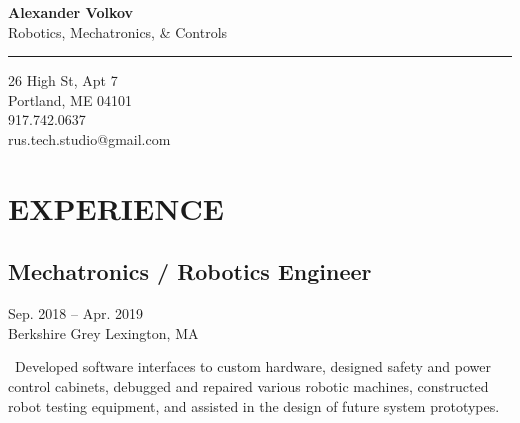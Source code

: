 \documentclass[]{article}
\begin{document}
\begin{center} %
	{\Large\bf Alexander Volkov}\\
	{\large Robotics, Mechatronics, \& Controls} \\
	
	\rule{\textwidth}{1pt}
	\vspace*{-0.5em}
	
	26 High St, Apt 7 \\
	Portland, ME 04101 \\
	917.742.0637 \\
	rus.tech.studio@gmail.com
\end{center}



\section*{EXPERIENCE}

\subsection*{Mechatronics / Robotics Engineer} \hfill Sep. 2018 -- Apr. 2019 \\
Berkshire Grey \hfill Lexington, MA

\textellipsis~Developed software interfaces to custom hardware, designed safety and power control cabinets, debugged and repaired various robotic machines, constructed robot testing equipment,  and assisted in the design of future system prototypes.

\end{document}
